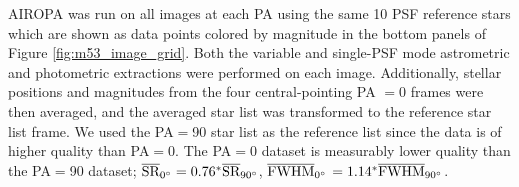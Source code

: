 \documentclass[]{spie}  %
\begin{document}
AIROPA was run on all images at each PA using the same 10 PSF reference stars which are shown as data points colored by magnitude in the bottom panels of Figure \ref{fig:m53_image_grid}. Both the variable and single-PSF mode astrometric and photometric extractions were performed on each image. Additionally, stellar positions and magnitudes from the four central-pointing PA $=0$ frames were then averaged, and the averaged star list was transformed to the reference star list frame. We used the PA$=$90 star list as the reference list since the data is of higher quality than PA$=$0. The PA$=$0 dataset is measurably lower quality than the PA$=$90 dataset; $\overline{\textrm{SR}}_{0\degree} = 0.76^{*}\overline{\textrm{SR}}_{90\degree}$, $\overline{\textrm{FWHM}}_{0\degree}$ $= 1.14^{*}\overline{\textrm{FWHM}}_{90\degree}$.




\end{document}
